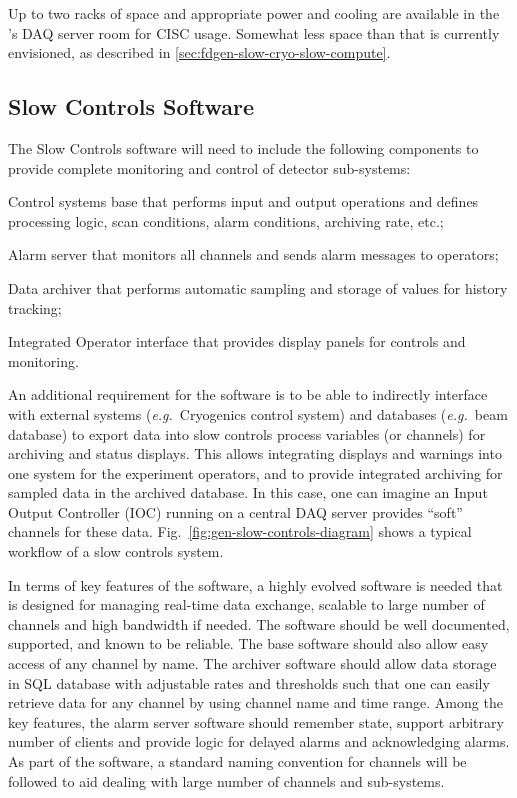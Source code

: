 Up to two racks of space and appropriate power and cooling are
available in the 's DAQ server room for CISC usage.
Somewhat less space than that is currently envisioned, as described in
\ref{sec:fdgen-slow-cryo-slow-compute}.

\subsection{Slow Controls Software}
\label{sec:fdgen-slow-cryo-sw}


The Slow Controls software will need to include the following components
to provide complete monitoring and control of detector sub-systems:
%
\begin{description}
 \item{Control systems base} that performs input and output operations
  and defines processing logic, scan conditions, alarm conditions,
  archiving rate, etc.;
 \item{Alarm server} that monitors all channels and sends alarm
  messages to operators; 
 \item{Data archiver} that performs automatic sampling and storage of
  values for history tracking;
 \item{Integrated Operator interface} that provides display panels for
  controls and monitoring.
\end{description}

An additional requirement for the software is to be able to indirectly
interface with external systems ({\em e.g.}\ Cryogenics control
system) and databases ({\em e.g.}\ beam database) to export data into
slow controls process variables (or channels) for archiving and status
displays. This allows integrating displays and warnings into one
system for the experiment operators, and to provide integrated
archiving for sampled data in the archived database. In this case, one
can imagine an Input Output Controller (IOC) running on a central DAQ
server provides ``soft'' channels for these data.
Fig.\ \ref{fig:gen-slow-controls-diagram} shows a typical workflow of a
slow controls system.

In terms of key features of the software, a highly evolved software is
needed that is designed for managing real-time data exchange, scalable
to large number of channels and high bandwidth if needed. The software
should be well documented, supported, and known to be reliable. The base
software should also allow easy access of any channel by name. The
archiver software should allow data storage in SQL database with
adjustable rates and thresholds such that one can easily retrieve data
for any channel by using channel name and time range. Among the key
features, the alarm server software should remember state, support
arbitrary number of clients and provide logic for delayed alarms and
acknowledging alarms. As part of the software, a standard naming
convention for channels will be followed to aid dealing with large
number of channels and sub-systems.



